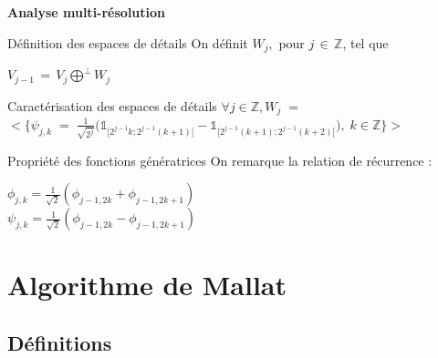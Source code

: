 \documentclass[10pt]{beamer}
\begin{document}
      \begin{frame}
	
	\textbf{Analyse multi-r\'{e}solution}
	
	\begin{beamerboxesrounded}[scheme=def]{D\'{e}finition des espaces de d\'{e}tails}
	  On d\'{e}finit $ W_j , $ pour $ j \, \in \, \mathbb{Z} $, tel que 
	  \begin{center}
	    \vspace{-0.4cm}
	    $ V_{j - 1} \, = \, V_j \displaystyle \bigoplus^\perp W_j $
	  \end{center}
	\end{beamerboxesrounded}
	
	\begin{beamerboxesrounded}[scheme=prop]{Caract\'{e}risation des espaces de d\'{e}tails}
	    \centering
	    $\forall j \in \mathbb{Z}, W_j \; = \; $ \\ $
	    \Bigg< \Big\{ \psi_{j,k} \; = \; \frac{1}{\sqrt{2^j}} \big(\mathbb{1}_{[2^{j - 1} k ; 2^{j - 1} (k + 1)[} - 
		\mathbb{1}_{[2^{j - 1} (k + 1) ; 2^{j - 1} (k + 2)[} \big),  \; k \in \mathbb{Z} \Big\} \Bigg>$ 
	\end{beamerboxesrounded}
	
	\begin{beamerboxesrounded}[scheme=prop]{Propri\'{e}t\'{e} des fonctions g\'{e}n\'{e}ratrices}
	  On remarque la relation de r\'{e}currence :
	    \begin{center}
	      $ \phi_{j,k} = \frac{1}{\sqrt{2}} (\phi_{j - 1, 2 k} + \phi_{j - 1, 2 k + 1}) $ \\
	      $ \psi_{j,k} = \frac{1}{\sqrt{2}} (\phi_{j - 1, 2 k} - \phi_{j - 1, 2 k + 1}) $
	    \end{center}
	\end{beamerboxesrounded}
	
      \end{frame}
      
  \section{Algorithme de Mallat}
  
    \subsection{D\'{e}finitions}
  
\end{document}
